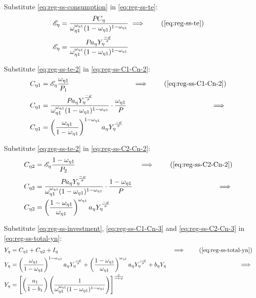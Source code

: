 \documentclass[../thesis.tex]{subfiles}
\begin{document}
	Substitute \ref{eq:reg-ss-consumption} in \ref{eq:reg-ss-te}:
	\begin{align}
		\te[] &= \frac{P_{} C_{\eta}}{\omega_{\eta 1}^{\omega_{\eta 1}} (1 -\omega_{\eta 1})^{1 -\omega_{\eta 1}}} \implies \tag{\ref{eq:reg-ss-te}} \\
		\te[] &= \frac{P_{} a_{\eta} Y_{\eta}^{\frac{-\varphi}{\sigma}}}{\omega_{\eta 1}^{\omega_{\eta 1}} (1 -\omega_{\eta 1})^{1 -\omega_{\eta 1}}} \label{eq:reg-ss-te-2}
	\end{align}

	Substitute \ref{eq:reg-ss-te-2} in \ref{eq:reg-ss-C1-Cn-2}:
	\begin{alignat}{2}
		C_{\eta 1} &= \te[] \frac{\omega_{\eta 1}}{P_{1}} &\implies \tag{\ref{eq:reg-ss-C1-Cn-2}} \\
		C_{\eta 1} &= \frac{P_{} a_{\eta} Y_{\eta}^{\frac{-\varphi}{\sigma}}}{\omega_{\eta 1}^{\omega_{\eta 1}} (1 -\omega_{\eta 1})^{1 -\omega_{\eta 1}}} \cdot \frac{\omega_{\eta 1}}{P_{}} &\implies \nonumber \\
		C_{\eta 1} &= \left( \frac{\omega_{\eta 1}}{1 -\omega_{\eta 1}} \right)^{1 -\omega_{\eta 1}} a_{\eta} Y_{\eta}^{\frac{-\varphi}{\sigma}} \label{eq:reg-ss-C1-Cn-3}
	\end{alignat}
		
	Substitute \ref{eq:reg-ss-te-2} in \ref{eq:reg-ss-C2-Cn-2}:
	\begin{alignat}{2}
		C_{\eta 2} &= \te[] \frac{1 -\omega_{\eta 1}}{P_{2}} &\implies \tag{\ref{eq:reg-ss-C2-Cn-2}} \\
		C_{\eta 2} &= \frac{P_{} a_{\eta} Y_{\eta}^{\frac{-\varphi}{\sigma}}}{\omega_{\eta 1}^{\omega_{\eta 1}} (1 -\omega_{\eta 1})^{1 -\omega_{\eta 1}}} \cdot \frac{1 -\omega_{\eta 1}}{P_{}} &\implies \nonumber \\
		C_{\eta 2} &= \left( \frac{1 -\omega_{\eta 1}}{\omega_{\eta 1}} \right)^{\omega_{\eta 1}} a_{\eta} Y_{\eta}^{\frac{-\varphi}{\sigma}} \label{eq:reg-ss-C2-Cn-3}
	\end{alignat}


Substitute \ref{eq:reg-ss-investment}, \ref{eq:reg-ss-C1-Cn-3} and \ref{eq:reg-ss-C2-Cn-3} in \ref{eq:reg-ss-total-yn}:
	\begin{alignat}{2}
		Y_{\eta} &= C_{\eta 1} + C_{\eta 2} + I_{\eta} &\implies \tag{\ref{eq:reg-ss-total-yn}} \\
		Y_{\eta} &= \left( \frac{\omega_{\eta 1}}{1 - \omega_{\eta 1}} \right)^{1 - \omega_{\eta 1}} a_{\eta} Y_{\eta}^{\frac{-\varphi}{\sigma}} + \left( \frac{1 -\omega_{\eta 1}}{\omega_{\eta 1}} \right)^{\omega_{\eta 1}} a_{\eta} Y_{\eta}^{\frac{-\varphi}{\sigma}} + b_{\eta} Y_{\eta} &\implies \nonumber \\
		Y_{\eta} &= \left[ \left( \frac{a_{1}}{1 - b_{1}} \right) \left( \frac{1}{\omega_{\eta 1}^{\omega_{\eta 1}} (1 - \omega_{\eta 1})^{1 - \omega_{\eta 1}}} \right) \right]^{\frac{\sigma}{\sigma + \varphi}} \label{eq:reg-ss-total-yn-2}
	\end{alignat}
\end{document}
